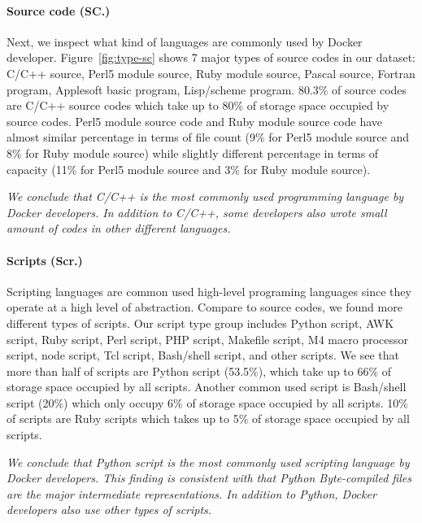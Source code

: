 \paragraph{Source code (SC.)}
Next, we inspect what kind of languages are commonly used by Docker developer. 
Figure~\ref{fig:type-sc} shows 7 major types of source codes in our dataset: C/C++ source, Perl5 module source, Ruby module source, Pascal source, Fortran program, Applesoft basic program, Lisp/scheme program.
80.3\% of source codes are C/C++ source codes which take up to 80\% of storage space occupied by source codes. Perl5 module source code and Ruby module source code have almost similar percentage in terms of file count (9\% for Perl5 module source and 8\% for Ruby module source) while slightly different percentage in terms of capacity (11\% for Perl5 module source and 3\% for Ruby module source).

\textit{We conclude that C/C++ is the most commonly used programming language by Docker developers. In addition to C/C++, some developers also wrote small amount of codes in other different languages.}


\paragraph{Scripts (Scr.)}
Scripting languages are common used high-level programing languages since they operate at a high level of abstraction. Compare to source codes, we found more different types of scripts. 
Our script type group includes Python script, AWK script, Ruby script, Perl script, PHP script, Makefile script, M4 macro processor script, node script, Tcl script, Bash/shell script, and other scripts.
We see that more than half of scripts are Python script (53.5\%), which take up to 66\% of storage space occupied by all scripts. Another common used script is Bash/shell script (20\%) which only occupy 6\% of storage space occupied by all scripts. 10\% of scripts are Ruby scripts which takes up to 5\% of storage space occupied by all scripts. %

\textit{We conclude that Python script is the most commonly used scripting language by Docker developers. This finding is consistent with that Python Byte-compiled files are the major intermediate representations.
	In addition to Python, Docker developers also use other types of scripts.}

